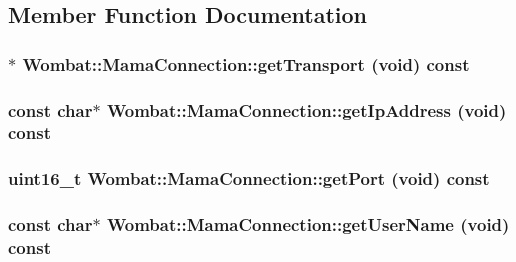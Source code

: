 \subsection{Member Function Documentation}
\hypertarget{classWombat_1_1MamaConnection_abdae42ad143c06a15bdb8a4aa88570b7}{
\subsubsection[{getTransport}]{$\ast$ Wombat::MamaConnection::getTransport (void) const}}
\label{classWombat_1_1MamaConnection_abdae42ad143c06a15bdb8a4aa88570b7}
\hypertarget{classWombat_1_1MamaConnection_ae8c6d8647f6d804eb97091ecb206ed68}{
\subsubsection[{getIpAddress}]{\setlength{\rightskip}{0pt plus 5cm}const char$\ast$ Wombat::MamaConnection::getIpAddress (void) const}}
\label{classWombat_1_1MamaConnection_ae8c6d8647f6d804eb97091ecb206ed68}
\hypertarget{classWombat_1_1MamaConnection_a9ac7eb70faffc4eb1faeb26e0e27ea1e}{
\subsubsection[{getPort}]{\setlength{\rightskip}{0pt plus 5cm}uint16\_\-t Wombat::MamaConnection::getPort (void) const}}
\label{classWombat_1_1MamaConnection_a9ac7eb70faffc4eb1faeb26e0e27ea1e}
\hypertarget{classWombat_1_1MamaConnection_a6d20dc37510423cea3ffcf7071552aa9}{
\subsubsection[{getUserName}]{\setlength{\rightskip}{0pt plus 5cm}const char$\ast$ Wombat::MamaConnection::getUserName (void) const}}
\label{classWombat_1_1MamaConnection_a6d20dc37510423cea3ffcf7071552aa9}
